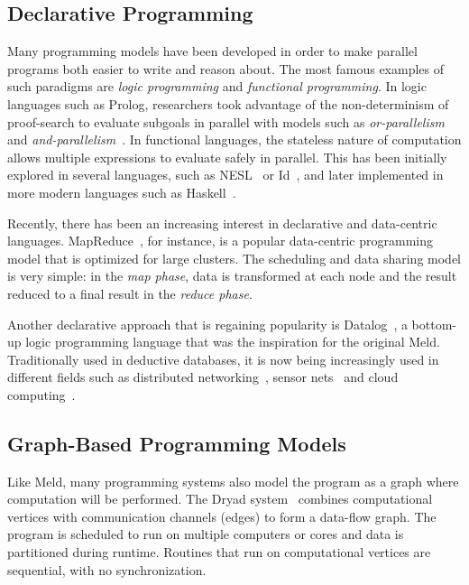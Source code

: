 \subsection{Declarative Programming}

Many programming models have been developed in order to make parallel programs both easier to write and reason about. The most famous examples of such paradigms are \emph{logic programming} and \emph{functional programming}.
In logic languages such as Prolog, researchers took advantage of the non-determinism of proof-search to evaluate subgoals
in parallel with models such as \emph{or-parallelism} and \emph{and-parallelism}~\cite{Gupta:2001:PEP:504083.504085}.
In functional languages, the stateless nature of computation allows multiple expressions to evaluate safely in parallel.
This has been initially explored in several languages, such as NESL~\cite{Blelloch:1996:PPA:227234.227246} or Id~\cite{Nikhil93anoverview}, and later implemented in more modern languages such as Haskell~\cite{Chakravarty07dataparallel}.

Recently, there has been an increasing interest in declarative and data-centric languages.
MapReduce~\cite{Dean:2008:MSD:1327452.1327492}, for instance, is a popular data-centric programming
model that is optimized for large clusters. The scheduling and data sharing model is very simple:
in the \emph{map phase}, data is transformed at each node and the result reduced to a final
result in the \emph{reduce phase}.

Another declarative approach that is regaining popularity is Datalog~\cite{Ullman:1990:PDK:533142}, a
bottom-up logic programming language that was the inspiration for the original Meld.
Traditionally used in deductive databases, it is now being increasingly used in different fields
such as distributed networking~\cite{Loo-condie-garofalakis-p2}, sensor
nets~\cite{Chu:2007:DID:1322263.1322281} and cloud computing~\cite{alvaro:boom}.

\subsection{Graph-Based Programming Models}

Like Meld, many programming systems also model the program as a graph where computation will be performed.
The Dryad system~\cite{Isard:2007:DDD:1272996.1273005} combines computational vertices
with communication channels (edges) to form a data-flow graph. The program is scheduled to
run on multiple computers or cores and data is partitioned during runtime. Routines that run on computational vertices
are sequential, with no synchronization.

